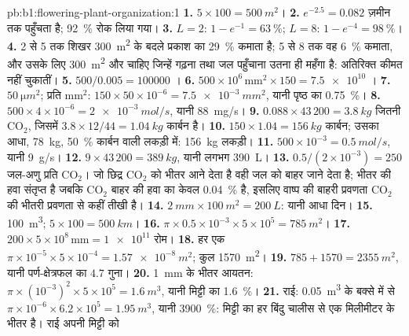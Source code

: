 \begin{solution}{pb:b1:flowering-plant-organization:1}
\textbf{1.} $5\times 100 = \qty{500}{m^2}$।
\textbf{2.} $e^{-2.5} = 0.082$ ज़मीन तक पहुँचता है; \qty{92}{\%}
रोक लिया गया।
\textbf{3.} $L = 2$: $1 - e^{-1} = \qty{63}{\%}$; $L = 8$: $1 -
e^{-4} = \qty{98}{\%}$।
\textbf{4.} 2 से 5 तक शिखर \qty{300}{m^2}  के बदले प्रकाश का
\qty{29}{\%} कमाता है; 5 से 8 तक वह \qty{6}{\%} कमाता, और उसके लिए
\qty{300}{m^2} और चाहिए जिन्हें गढ़ना तथा जल पहुँचाना उतना ही महँगा है:
अतिरिक्त  कीमत नहीं चुकातीं।
\textbf{5.} $500/0.005 = \num{100000}$ ।
\textbf{6.} $500\times 10^6\,\mathrm{mm^2}\times 150 = \num{7.5e10}$
।
\textbf{7.} $\qty{50}{\micro m^2}$; प्रति mm$^2$: $150\times 50\times
10^{-6} = \qty{7.5e-3}{mm^2}$, यानी पृष्ठ का \qty{0.75}{\%}।
\textbf{8.} $500\times 4\times 10^{-6} = \qty{2e-3}{mol/s}$, यानी
\qty{88}{mg/s}।
\textbf{9.} $0.088\times 43\,200 = \qty{3.8}{kg}$ जितनी $\mathrm{CO_2}$,
जिसमें $3.8\times 12/44 = \qty{1.04}{kg}$ कार्बन है।
\textbf{10.} $150\times 1.04 = \qty{156}{kg}$ कार्बन; उसका आधा,
\qty{78}{kg}, \qty{50}{\%} कार्बन वाली लकड़ी में: \qty{156}{kg} लकड़ी।
\textbf{11.} $500\times 10^{-3} = \qty{0.5}{mol/s}$, यानी \qty{9}{g/s}।
\textbf{12.} $9\times 43\,200 = \qty{389}{kg}$, यानी लगभग \qty{390}{L}।
\textbf{13.} $0.5/(2\times 10^{-3}) = 250$ जल-अणु प्रति $\mathrm{CO_2}$।
जो छिद्र $\mathrm{CO_2}$ को भीतर आने देता है वही जल को बाहर जाने देता है;
भीतर की हवा संतृप्त है जबकि $\mathrm{CO_2}$ बाहर की हवा का केवल
\qty{0.04}{\%} है, इसलिए वाष्प की बाहरी प्रवणता $\mathrm{CO_2}$ की भीतरी
प्रवणता से कहीं तीखी है।
\textbf{14.} $\qty{2}{mm}\times\qty{100}{m^2} = \qty{200}{L}$: यानी आधा
दिन।
\textbf{15.} \qty{100}{m^3}; $5\times 100 = \qty{500}{km}$।
\textbf{16.} $\pi\times 0.5\times 10^{-3}\times 5\times 10^5 =
\qty{785}{m^2}$।
\textbf{17.} $200\times 5\times 10^8\,\mathrm{mm} = \num{1e11}$ रोम।
\textbf{18.} हर एक $\pi\times 10^{-5}\times 5\times 10^{-4} =
\qty{1.57e-8}{m^2}$; कुल \qty{1570}{m^2}।
\textbf{19.} $785 + 1570 = \qty{2355}{m^2}$, यानी पर्ण-क्षेत्रफल का $4.7$ गुना।
\textbf{20.} \qty{1}{mm} के भीतर आयतन: $\pi\times(10^{-3})^2\times 5
\times 10^5 = \qty{1.6}{m^3}$, यानी मिट्टी का \qty{1.6}{\%}।
\textbf{21.} राई: \qty{0.05}{m^3} के बक्से में से $\pi\times 10^{-6}\times 6.2\times 10^5 =
\qty{1.95}{m^3}$, यानी \qty{3900}{\%}: मिट्टी का हर
बिंदु चालीस  से एक मिलीमीटर के भीतर है। राई अपनी मिट्टी को

\end{solution}
